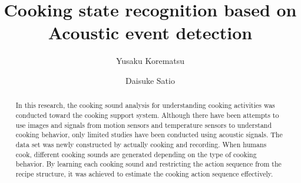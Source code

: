\documentclass[sigchi]{acmart}
\begin{document}
\title{Cooking state recognition based on \\ Acoustic event detection}

\author{Yusaku Korematsu}
\author{Daisuke Satio}
\authornotemark[1]

%

%
\begin{abstract}
  In this research, the cooking sound analysis for understanding cooking activities was conducted toward the cooking support system.
  Although there have been attempts to use images and signals from motion sensors and temperature sensors to understand cooking behavior, only limited studies have been conducted using acoustic signals.
  The data set was newly constructed by actually cooking and recording.
  When humans cook, different cooking sounds are generated depending on the type of cooking behavior. By learning each cooking sound and restricting the action sequence from the recipe structure, it was achieved to estimate the cooking action sequence effectively.
\end{abstract}
\end{document}
